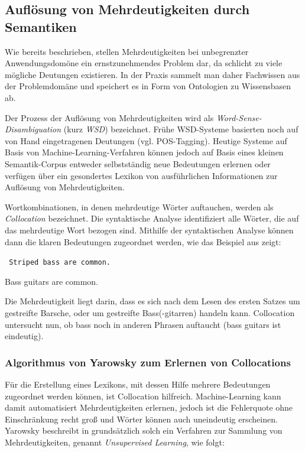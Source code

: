 \documentclass[12pt]{report}
\begin{document}
\subsection{Auflösung von Mehrdeutigkeiten durch \\Semantiken}
Wie bereits beschrieben, stellen Mehrdeutigkeiten bei unbegrenzter Anwendungsdomöne ein ernstzunehmendes Problem dar, da schlicht zu viele mögliche Deutungen existieren. In der Praxis sammelt man daher Fachwissen aus der Problemdomäne und speichert es in Form von Ontologien zu Wissensbasen ab.

Der Prozess der Auflösung von Mehrdeutigkeiten wird als \textit{Word-Sense-Disambiguation} (kurz \textit{WSD}) bezeichnet. Frühe WSD-Systeme basierten noch auf von Hand eingetragenen Deutungen (vgl. POS-Tagging). Heutige Systeme auf Basis von Machine-Learning-Verfahren können jedoch auf Basis eines kleinen Semantik-Corpus entweder selbstständig neue Bedeutungen erlernen oder verfügen über ein gesondertes Lexikon von ausführlichen Informationen zur Auflösung von Mehrdeutigkeiten. 

Wortkombinationen, in denen mehrdeutige Wörter auftauchen, werden als \textit{Collocation} bezeichnet. Die syntaktische Analyse identifiziert alle Wörter, die auf das mehrdeutige Wort bezogen sind. Mithilfe der syntaktischen Analyse können dann die klaren Bedeutungen zugeordnet werden, wie das Beispiel aus \cite{cop04} zeigt:

\tt
Striped bass are common.

Bass guitars are common.
\rm

Die Mehrdeutigkeit liegt darin, dass es sich nach dem Lesen des ersten Satzes um gestreifte Barsche, oder um gestreifte Bass(-gitarren) handeln kann. Collocation untersucht nun, ob bass noch in anderen Phrasen auftaucht (bass guitars ist eindeutig).

\subsubsection{Algorithmus von Yarowsky zum Erlernen von Collocations}
Für die Erstellung eines Lexikons, mit dessen Hilfe mehrere Bedeutungen zugeordnet werden können, ist Collocation hilfreich. Machine-Learning kann damit automatisiert Mehrdeutigkeiten erlernen, jedoch ist die Fehlerquote ohne Einschränkung recht groß und Wörter können auch uneindeutig erscheinen. Yarowsky beschreibt in \cite{yar95} grundsätzlich solch ein Verfahren zur Sammlung von Mehrdeutigkeiten, genannt \textit{Unsupervised Learning}, wie folgt: 
\end{document}
